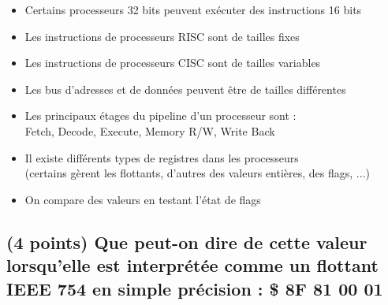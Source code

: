 \documentclass[11pt,a4paper]{article}
\begin{document}
\begin{itemize}
  \item[\CaseCoche] Certains processeurs 32 bits peuvent exécuter des instructions 16 bits \\
  \item[\CaseCoche] Les instructions de processeurs RISC sont de tailles fixes \\
  \item[\CaseCoche] Les instructions de processeurs CISC sont de tailles variables \\
  \item[\CaseCoche] Les bus d'adresses et de données peuvent être de tailles différentes \\
  \item[\CaseCoche] Les principaux étages du pipeline d'un processeur sont : \\
  Fetch, Decode, Execute, Memory R/W, Write Back \\
  \item[\CaseCoche] Il existe différents types de registres dans les processeurs \\
  (certains gèrent les flottants, d'autres des valeurs entières, des flags, ...) \\
  \item[\CaseCoche] On compare des valeurs en testant l'état de flags \\
\end{itemize}


\bigskip


\subsection{(4 points) Que peut-on dire de cette valeur lorsqu'elle est interprétée comme un flottant IEEE 754 en simple précision : \$ 8F 81 00 01 }
\end{document}
